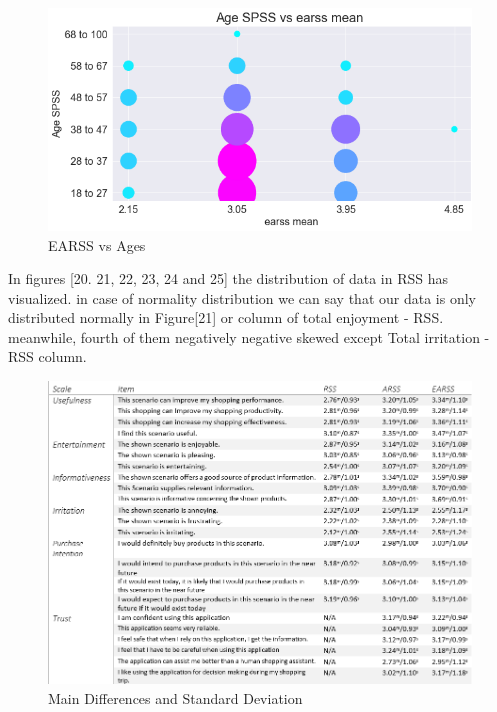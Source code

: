 \documentclass[letterpaper, 10 pt, conference]{ieeeconf}
\begin{document}
\begin{figure}[!ht]
    \centering
    \includegraphics[scale = 0.5]{Picture15.png}
    \caption{EARSS vs Ages}
\end{figure}
In figures [20. 21, 22, 23, 24 and 25] the distribution of data in RSS has visualized. in case of normality distribution we can say that our data is only distributed normally in Figure[21] or column of total enjoyment - RSS. meanwhile, fourth of them negatively negative skewed except Total irritation - RSS column.\\

\pagebreak

\begin{figure}[!ht]
    \centering
    \includegraphics[scale = 0.7]{Picture17.png}
    \caption{Main Differences and Standard Deviation}
\end{figure}
\end{document}
